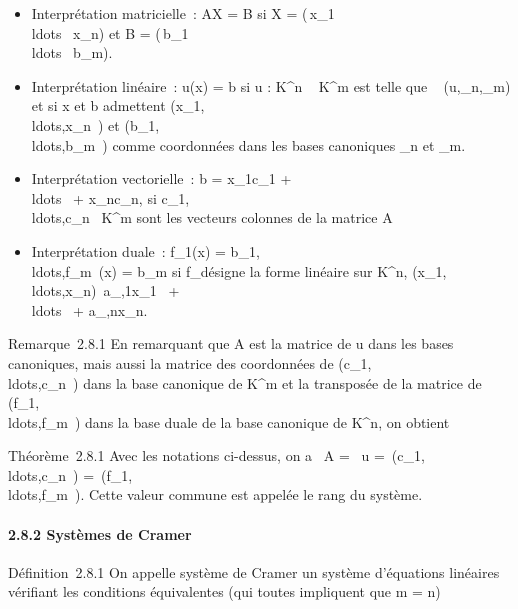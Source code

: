 \documentclass[]{article}
\begin{document}
\begin{itemize}
\itemsep1pt\parskip0pt
\item
  Interprétation matricielle~: AX = B si X = \left
  (\matrix\,x\_1
  \cr
  \\ldots~
  \cr x\_n\right ) et B =
  \left
  (\matrix\,b\_1
  \cr
  \\ldots~
  \cr b\_m\right ).
\item
  Interprétation linéaire~: u(x) = b si u : K^n \rightarrow~
  K^m est telle que
  \mathrmMat~
  (u,\textCan\_n,\textCan\_m)
  et si x et b admettent
  (x\_1,\\ldots,x\_n~)
  et
  (b\_1,\\ldots,b\_m~)
  comme coordonnées dans les bases canoniques
  \textCan\_n et
  \textCan\_m.
\item
  Interprétation vectorielle~: b = x\_1c\_1 +
  \\ldots~ +
  x\_nc\_n, si
  c\_1,\\ldots,c\_n~
  \in K^m sont les vecteurs colonnes de la matrice A
\item
  Interprétation duale~: f\_1(x) =
  b\_1,\\ldots,f\_m~(x)
  = b\_m si f\_\jmath désigne la forme linéaire sur
  K^n,
  (x\_1,\\ldots,x\_n)\mapsto~a\_\jmath,1x\_1~
  + \\ldots~ +
  a\_\jmath,nx\_n.
\end{itemize}

Remarque~2.8.1 En remarquant que A est la matrice de u dans les bases
canoniques, mais aussi la matrice des coordonnées de
(c\_1,\\ldots,c\_n~)
dans la base canonique de K^m et la transposée de la matrice
de
(f\_1,\\ldots,f\_m~)
dans la base duale de la base canonique de K^n, on obtient

Théorème~2.8.1 Avec les notations ci-dessus, on a
\mathrmrg~A
= \mathrmrg~u
=\
\mathrmrg(c\_1,\\ldots,c\_n~)
=\
\mathrmrg(f\_1,\\ldots,f\_m~).
Cette valeur commune est appelée le rang du système.

\paragraph{2.8.2 Systèmes de Cramer}

Définition~2.8.1 On appelle système de Cramer un système d'équations
linéaires vérifiant les conditions équivalentes (qui toutes impliquent
que m = n)
\end{document}
